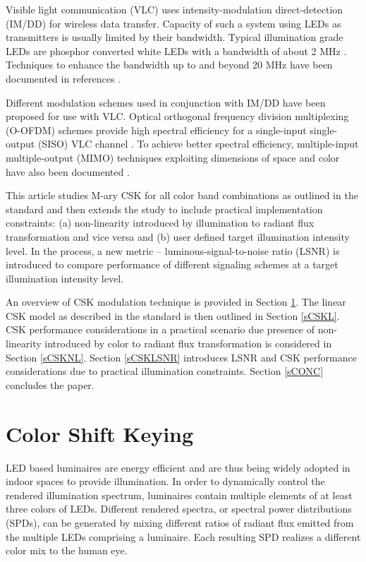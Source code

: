 \documentclass[10pt,letterpaper]{article}
\begin{document}
Visible light communication (VLC) uses intensity-modulation
direct-detection (IM/DD) for wireless data transfer. Capacity of such
a system using LEDs as transmitters is usually limited by their
bandwidth. Typical illumination grade LEDs are phosphor converted
white LEDs with a bandwidth of about 2 MHz \cite{gru08b}. Techniques
to enhance the bandwidth up to and beyond 20 MHz have been documented
in references \cite{gru08b,min08a}.

Different modulation schemes used in conjunction with IM/DD have been
proposed for use with VLC. Optical orthogonal frequency division
multiplexing (O-OFDM) schemes provide high spectral efficiency for a
single-input single-output (SISO) VLC channel \cite{arm09a}. To
achieve better spectral efficiency, multiple-input multiple-output
(MIMO) techniques exploiting dimensions of space and color have also
been documented \cite{but14b,cskxy,but12a}.

This article studies M-ary CSK for all color band combinations as
outlined in the standard and then extends the study to include
practical implementation constraints: (a) non-linearity introduced by
illumination to radiant flux transformation and vice versa and (b) user
defined target illumination intensity level. In the process, a new
metric -- luminous-signal-to-noise ratio (LSNR) is introduced to
compare performance of different signaling schemes at a target
illumination intensity level.

An overview of CSK modulation technique is provided in
Section \ref{sCSK}. The linear CSK model as described in the standard is then outlined in Section \ref{sCSKL}. CSK performance considerations in a practical scenario due presence of non-linearity introduced by color to radiant flux transformation is
considered in Section \ref{sCSKNL}. Section \ref{sCSKLSNR} introduces
LSNR and CSK performance considerations due to practical illumination
constraints. Section \ref{sCONC} concludes the paper.

\section{Color Shift Keying}\label{sCSK}
LED based luminaires are energy efficient and are thus being widely
adopted in indoor spaces to provide illumination. In order to
dynamically control the rendered illumination spectrum, luminaires
contain multiple elements of at least three colors of LEDs. Different
rendered spectra, or spectral power distributions (SPDs), can be
generated by mixing different ratios of radiant flux emitted from the
multiple LEDs comprising a luminaire. Each resulting SPD realizes
a different color mix to the human eye.
\end{document}
